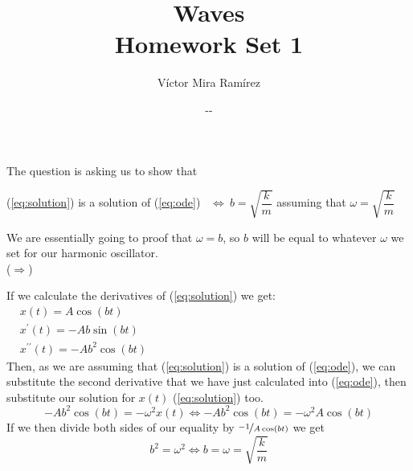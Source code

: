 \documentclass{report}
\title{\Huge{Waves\\Homework Set 1}}
\author{Víctor Mira Ramírez}
\date{\number\month -\number\day -\number\year}
\begin{document}
\maketitle
\clearpage

  \noindent The question is asking us to show that
  \begin{center}
    \centering(\ref{eq:solution}) is a solution of (\ref{eq:ode}) \ $\Longleftrightarrow\ b=\sqrt{\dfrac{k}{m}}$ \hspace{1cm}assuming that $\omega=\sqrt{\dfrac{k}{m}}$\\
  \end{center}

  \noindent We are essentially going to proof that $\omega=b$, so $b$ will be equal to whatever $\omega$ we set for our harmonic oscillator.\\

  \noindent ($\Longrightarrow$)
  \begin{addmargin}{1cm}
    \noindent If we calculate the derivatives of (\ref{eq:solution}) we get:\\
    
    \vspace{-0.2cm}$\begin{aligned}
      &x(t)=A\cos(bt)\\
      &x^\prime(t)=-Ab\sin(bt)\\
      &x^{\prime\prime}(t)=-Ab^2\cos(bt)
    \end{aligned}$\\

    \noindent Then, as we are assuming that (\ref{eq:solution}) is a solution of (\ref{eq:ode}), we can substitute the second derivative that we have just calculated into (\ref{eq:ode}), then substitute our solution for $x(t)$ (\ref{eq:solution}) too.
    \[-Ab^2\cos(bt)=-\omega^2x(t)\Longleftrightarrow -Ab^2\cos(bt)=-\omega^2A\cos(bt)\]
    If we then divide both sides of our equality by $\nicefrac{-1}{A\cos(bt)}$ we get 
    \[b^2=\omega^2\Longleftrightarrow b=\omega =\sqrt{\dfrac{k}{m}}\]
  \end{addmargin}
\end{document}
